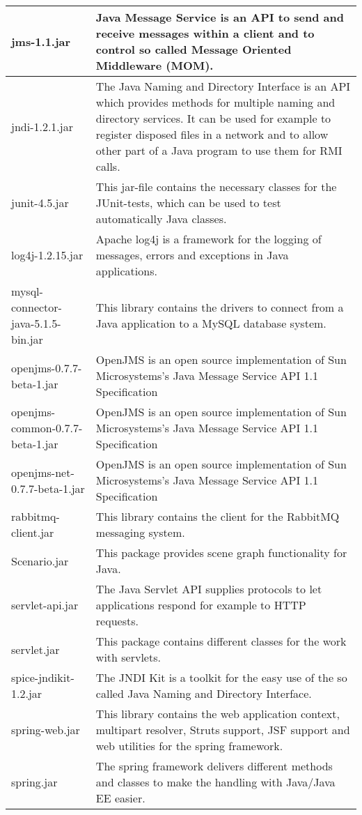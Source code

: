 \begin{center}
\begin{longtable}{|p{}|p{}|}
\hline 
jms-1.1.jar & Java Message Service is an API to send and receive messages within a client and to control so called Message Oriented Middleware (MOM).\\
\hline 
jndi-1.2.1.jar & The Java Naming and Directory Interface is an API which provides methods for multiple naming and directory services. It can be used for example to register disposed files in a network and to allow other part of a Java program to use them for RMI calls.\\
\hline 
junit-4.5.jar & This jar-file contains the necessary classes for the JUnit-tests, which can be used to test automatically Java classes.\\
\hline 
log4j-1.2.15.jar & Apache log4j is a framework for the logging of messages, errors and exceptions in Java applications.\\
\hline 
mysql-connector-java-5.1.5-bin.jar & This library contains the drivers to connect from a Java application to a MySQL database system.\\
\hline 
openjms-0.7.7-beta-1.jar & OpenJMS is an open source implementation of Sun Microsystems's Java Message Service API 1.1 Specification\\
\hline 
openjms-common-0.7.7-beta-1.jar & OpenJMS is an open source implementation of Sun Microsystems's Java Message Service API 1.1 Specification\\
\hline 
openjms-net-0.7.7-beta-1.jar & OpenJMS is an open source implementation of Sun Microsystems's Java Message Service API 1.1 Specification\\
\hline 
rabbitmq-client.jar & This library contains the client for the RabbitMQ messaging system.\\
\hline 
Scenario.jar & This package provides scene graph functionality for Java.\\
\hline 
servlet-api.jar & The Java Servlet API supplies protocols to let applications respond for example to HTTP requests.\\
\hline 
servlet.jar & This package contains different classes for the work with servlets.\\
\hline 
spice-jndikit-1.2.jar & The JNDI Kit is a toolkit for the easy use of the so called Java Naming and Directory Interface.\\
\hline 
spring-web.jar & This library contains the web application context, multipart resolver, Struts support, JSF support and web utilities for the spring framework.\\
\hline 
spring.jar & The spring framework delivers different methods and classes to make the handling with Java/Java EE easier.\\
\hline 
\end{longtable}
\label{tabular:libraries}
\end{center}
